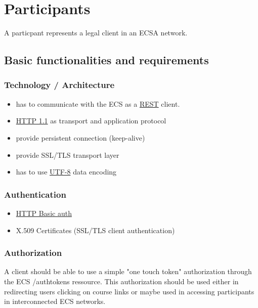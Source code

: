 \chapter{Participants}
A particpant represents a legal client in an ECSA network.

\section{Basic functionalities and requirements}
\subsection{Technology / Architecture}
\begin{itemize}
  \item has to communicate with the ECS as a
  \href{http://en.wikipedia.org/wiki/REST}{REST} client.
  \item \href{http://www.w3.org/Protocols/rfc2616/rfc2616.html}{HTTP 1.1} as
  transport and application protocol
  \item provide persistent connection (keep-alive)
  \item provide SSL/TLS transport layer
  \item has to use \href{http://en.wikipedia.org/wiki/UTF-8}{UTF-8} data
    encoding
\end{itemize}

\subsection{Authentication}
\begin{itemize}
  \item \href{http://en.wikipedia.org/wiki/Basic_access_authentication}{HTTP
  Basic auth}
  \item X.509 Certificates (SSL/TLS client authentication)
\end{itemize}

\subsection{Authorization}
  A client should be able to use a simple "one touch token"
  authorization through the ECS /authtokens ressource. This authorization
  should be used either in redirecting users clicking on course links or
  maybe used in accessing participants in interconnected ECS networks. 


